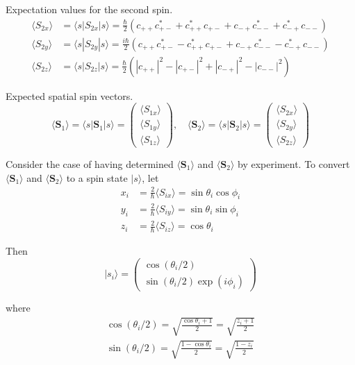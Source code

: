 Expectation values for the second spin.
\begin{align*}
\langle S_{2x}\rangle&=\langle s|S_{2x}|s\rangle
=\frac{\hbar}{2}
\left(c_{++}c_{+-}^*+c_{++}^*c_{+-}+c_{-+}c_{--}^*+c_{-+}^*c_{--}\right)
\\
\langle S_{2y}\rangle&=\langle s|S_{2y}|s\rangle
=\frac{i\hbar}{2}
\left(c_{++}c_{+-}^*-c_{++}^*c_{+-}+c_{-+}c_{--}^*-c_{-+}^*c_{--}\right)
\\
\langle S_{2z}\rangle&=\langle s|S_{2z}|s\rangle
=\frac{\hbar}{2}
\left(|c_{++}|^2-|c_{+-}|^2+|c_{-+}|^2-|c_{--}|^2\right)
\end{align*}

Expected spatial spin vectors.
\begin{equation*}
\langle\mathbf S_1\rangle=\langle s|\mathbf S_1|s\rangle
=\begin{pmatrix}
\langle S_{1x}\rangle\\
\langle S_{1y}\rangle\\
\langle S_{1z}\rangle
\end{pmatrix},\quad
\langle\mathbf S_2\rangle=\langle s|\mathbf S_2|s\rangle
=\begin{pmatrix}
\langle S_{2x}\rangle\\
\langle S_{2y}\rangle\\
\langle S_{2z}\rangle
\end{pmatrix}
\end{equation*}

Consider the case of having determined $\langle\mathbf S_1\rangle$ and
$\langle\mathbf S_2\rangle$ by experiment.
To convert $\langle\mathbf S_1\rangle$ and $\langle\mathbf S_2\rangle$
to a spin state $|s\rangle$, let
\begin{align*}
x_i&=\frac{2}{\hbar}\langle S_{ix}\rangle=\sin\theta_i\cos\phi_i
\\
y_i&=\frac{2}{\hbar}\langle S_{iy}\rangle=\sin\theta_i\sin\phi_i
\\
z_i&=\frac{2}{\hbar}\langle S_{iz}\rangle=\cos\theta_i
\end{align*}

Then
\begin{equation*}
|s_i\rangle=\begin{pmatrix}\cos(\theta_i/2)\\\sin(\theta_i/2)\exp(i\phi_i)\end{pmatrix}
\end{equation*}

where
\begin{align*}
\cos(\theta_i/2)=\sqrt{\frac{\cos\theta_i+1}{2}}=\sqrt{\frac{z_i+1}{2}}
\\
\sin(\theta_i/2)=\sqrt{\frac{1-\cos\theta_i}{2}}=\sqrt{\frac{1-z_i}{2}}
\end{align*}

